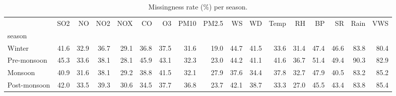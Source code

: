 \begin{table}
\caption{Missingness rate (\%) per season.}
\label{tab:missingness_season}
\begin{tabular}{lrrrrrrrrrrrrrrrr}
\toprule
 & SO2 & NO & NO2 & NOX & CO & O3 & PM10 & PM2.5 & WS & WD & Temp & RH & BP & SR & Rain & VWS \\
season &  &  &  &  &  &  &  &  &  &  &  &  &  &  &  &  \\
\midrule
Winter & 41.6 & 32.9 & 36.7 & 29.1 & 36.8 & 37.5 & 31.6 & 19.0 & 44.7 & 41.5 & 33.6 & 31.4 & 47.4 & 46.6 & 83.8 & 80.4 \\
Pre-monsoon & 45.3 & 33.6 & 38.1 & 28.1 & 45.9 & 43.1 & 32.3 & 23.0 & 44.2 & 41.1 & 41.6 & 36.7 & 51.4 & 49.4 & 90.3 & 82.9 \\
Monsoon & 40.9 & 31.6 & 38.1 & 29.2 & 38.8 & 41.5 & 32.1 & 27.9 & 37.6 & 34.4 & 37.8 & 32.7 & 47.9 & 40.5 & 83.2 & 85.2 \\
Post-monsoon & 42.0 & 33.5 & 39.3 & 30.6 & 34.5 & 37.7 & 36.8 & 23.7 & 42.1 & 38.7 & 33.3 & 27.0 & 45.5 & 43.4 & 83.8 & 85.4 \\
\bottomrule
\end{tabular}
\end{table}
